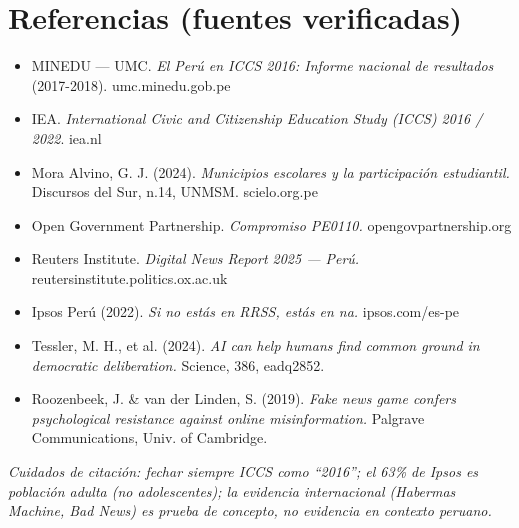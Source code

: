\documentclass[11pt,a4paper]{article}
\begin{document}
\section*{Referencias (fuentes verificadas)}
\small
\begin{itemize}[leftmargin=*, itemsep=1pt]
  \item MINEDU --- UMC. \textit{El Per\'u en ICCS 2016: Informe nacional de resultados} (2017-2018). umc.minedu.gob.pe
  \item IEA. \textit{International Civic and Citizenship Education Study (ICCS) 2016 / 2022}. iea.nl
  \item Mora Alvino, G. J. (2024). \textit{Municipios escolares y la participaci\'on estudiantil.} Discursos del Sur, n.14, UNMSM. scielo.org.pe
  \item Open Government Partnership. \textit{Compromiso PE0110.} opengovpartnership.org
  \item Reuters Institute. \textit{Digital News Report 2025 --- Per\'u.} reutersinstitute.politics.ox.ac.uk
  \item Ipsos Per\'u (2022). \textit{Si no est\'as en RRSS, est\'as en na.} ipsos.com/es-pe
  \item Tessler, M. H., et al. (2024). \textit{AI can help humans find common ground in democratic deliberation.} Science, 386, eadq2852.
  \item Roozenbeek, J. \& van der Linden, S. (2019). \textit{Fake news game confers psychological resistance against online misinformation.} Palgrave Communications, Univ. of Cambridge.
\end{itemize}
\normalsize

\vfill
\noindent\footnotesize\textit{Cuidados de citaci\'on: fechar siempre ICCS como ``2016''; el 63\% de Ipsos es poblaci\'on adulta (no adolescentes); la evidencia internacional (Habermas Machine, Bad News) es prueba de concepto, no evidencia en contexto peruano.}
\end{document}
